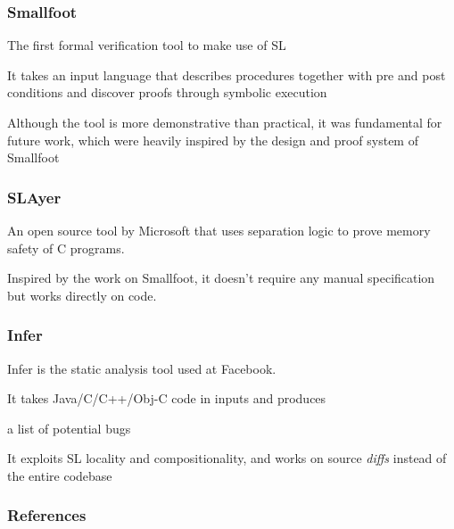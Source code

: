 \documentclass{beamer}
\begin{document}
    \begin{frame}
      \frametitle{Smallfoot}
        \begin{card}
            
            The first formal verification tool to make use of SL
        \end{card}

        \begin{card}
            It takes an input language that describes procedures together with pre and post conditions
            and discover proofs through symbolic execution
        \end{card}

        \begin{card}
            Although the tool is more demonstrative than practical, it was fundamental for future work, 
            which were heavily inspired by the design and proof system of Smallfoot
        \end{card}
    \end{frame}
    \begin{frame}
        \frametitle{SLAyer}

        \begin{card}
            An open source tool by Microsoft that uses separation 
            logic to prove memory safety of C programs.
        \end{card}
        \begin{card}
            Inspired by the work on Smallfoot, it doesn't require any 
            manual specification but works directly on code.
        \end{card}
    \end{frame}
    \begin{frame}
        \frametitle{Infer}
        
        \begin{card}
            Infer is the static analysis tool used at Facebook.
            
            It takes Java/C/C++/Obj-C code in inputs and produces
            
            a list of potential bugs
        \end{card}
        
        \begin{card}
            It exploits SL locality and compositionality, and works on source \emph{diffs} instead of the entire codebase
        \end{card}
    \end{frame}

    \begin{frame}[allowframebreaks]
     
        \nocite{*}
        \frametitle{References}
        
        
    \end{frame}
\end{document}
